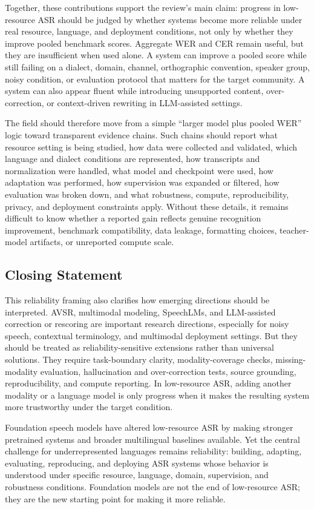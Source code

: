 \documentclass[pdflatex,sn-basic]{sn-jnl}
\theoremstyle{thmstyleone}
\theoremstyle{thmstyletwo}
\theoremstyle{thmstylethree}
\begin{document}
Together, these contributions support the review's main claim: progress in low-resource ASR should be judged by whether systems become more reliable under real resource, language, and deployment conditions, not only by whether they improve pooled benchmark scores. Aggregate WER and CER remain useful, but they are insufficient when used alone. A system can improve a pooled score while still failing on a dialect, domain, channel, orthographic convention, speaker group, noisy condition, or evaluation protocol that matters for the target community. A system can also appear fluent while introducing unsupported content, over-correction, or context-driven rewriting in LLM-assisted settings.

The field should therefore move from a simple ``larger model plus pooled WER'' logic toward transparent evidence chains. Such chains should report what resource setting is being studied, how data were collected and validated, which language and dialect conditions are represented, how transcripts and normalization were handled, what model and checkpoint were used, how adaptation was performed, how supervision was expanded or filtered, how evaluation was broken down, and what robustness, compute, reproducibility, privacy, and deployment constraints apply. Without these details, it remains difficult to know whether a reported gain reflects genuine recognition improvement, benchmark compatibility, data leakage, formatting choices, teacher-model artifacts, or unreported compute scale.

\subsection{Closing Statement}

This reliability framing also clarifies how emerging directions should be interpreted. AVSR, multimodal modeling, SpeechLMs, and LLM-assisted correction or rescoring are important research directions, especially for noisy speech, contextual terminology, and multimodal deployment settings. But they should be treated as reliability-sensitive extensions rather than universal solutions. They require task-boundary clarity, modality-coverage checks, missing-modality evaluation, hallucination and over-correction tests, source grounding, reproducibility, and compute reporting. In low-resource ASR, adding another modality or a language model is only progress when it makes the resulting system more trustworthy under the target condition.

Foundation speech models have altered low-resource ASR by making stronger pretrained systems and broader multilingual baselines available. Yet the central challenge for underrepresented languages remains reliability: building, adapting, evaluating, reproducing, and deploying ASR systems whose behavior is understood under specific resource, language, domain, supervision, and robustness conditions. Foundation models are not the end of low-resource ASR; they are the new starting point for making it more reliable.
\end{document}
